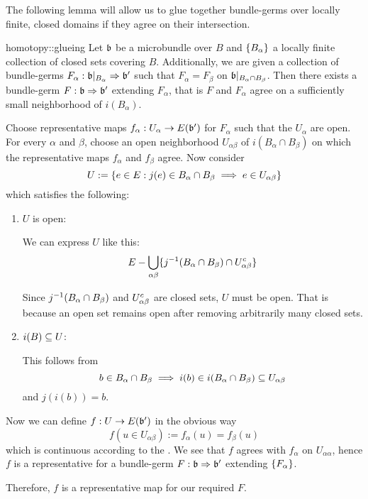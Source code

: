 \begin{myparagraph}
    The following lemma will allow us to glue
    together bundle-germs over locally finite, closed domains if they agree on their intersection.
\end{myparagraph}

\begin{mylemma}{homotopy::glueing}{}
    Let $\mathfrak{b}$ be a microbundle over $B$ and $\{B_\alpha\}$ a locally finite collection of closed sets covering $B$.
    Additionally, we are given a collection of bundle-germs $F_\alpha: \mathfrak{b}\vert_{B_\alpha} \Rightarrow{} \mathfrak{b}'$
    such that $F_\alpha = F_\beta$ on $\mathfrak{b}\vert_{B_\alpha \cap B_\beta}$.
    Then there exists a bundle-germ $F: \mathfrak{b} \Rightarrow{} \mathfrak{b}'$ extending $F_\alpha$,
    that is $F$ and $F_\alpha$ agree on a sufficiently small neighborhood of $i(B_\alpha)$.
\end{mylemma}

\begin{myproof}
    Choose representative maps $f_\alpha: U_\alpha \to E(\mathfrak{b}')$ for $F_\alpha$ such that the $U_\alpha$ are open.
    For every $\alpha$ and $\beta$, choose an open neighborhood $U_{\alpha\beta}$ of $i(B_\alpha \cap B_\beta)$ on which the representative maps $f_\alpha$ and $f_\beta$ agree.
    Now consider
    \[ U := \{ e \in E:j(e) \in B_\alpha \cap B_\beta \implies e \in U_{\alpha\beta}\} \]
    which satisfies the following:
    \begin{enumerate}
        \item $U$ is open:

        We can express $U$ like this:
        \[ E - \bigcup_{\alpha\beta} \{ j^{-1}(B_\alpha \cap B_\beta) \cap U_{\alpha\beta}^c \} \]
        
        Since $j^{-1}(B_\alpha \cap B_\beta)$ and $U_{\alpha\beta}^c$ are closed sets, $U$ must be open.
        That is because an open set remains open after removing arbitrarily many closed sets.
        \item $i(B) \subseteq{} U$:
        
        This follows from
        \[ b \in B_\alpha \cap B_\beta \implies i(b) \in i(B_\alpha \cap B_\beta) \subseteq{} U_{\alpha\beta} \]
        and $j(i(b)) = b$.
    \end{enumerate}
    Now we can define $f: U \to E(\mathfrak{b}')$ in the obvious way
    \[ f(u \in U_{\alpha\beta}) := f_\alpha(u) = f_\beta(u) \]
    which is continuous according to the .
    We see that $f$ agrees with $f_\alpha$ on $U_{\alpha\alpha}$,
    hence $f$ is a representative for a bundle-germ $F: \mathfrak{b} \Rightarrow{} \mathfrak{b}'$ extending $\{F_\alpha\}$.
    
    Therefore, $f$ is a representative map for our required $F$.
\end{myproof}